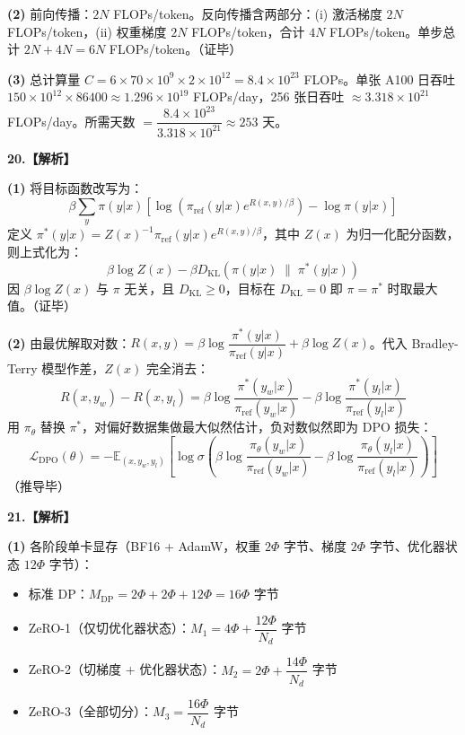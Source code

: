 \documentclass[a4paper]{ctexart}
\begin{document}
\vspace{0.4em}
\textbf{(2)} 前向传播：$2N$ FLOPs/token。反向传播含两部分：(i) 激活梯度 $2N$ FLOPs/token，(ii) 权重梯度 $2N$ FLOPs/token，合计 $4N$ FLOPs/token。单步总计 $2N+4N=6N$ FLOPs/token。\quad（证毕）

\vspace{0.4em}
\textbf{(3)} 总计算量 $C=6\times70\times10^9\times2\times10^{12}=8.4\times10^{23}$ FLOPs。单张 A100 日吞吐 $150\times10^{12}\times86400\approx1.296\times10^{19}$ FLOPs/day，256 张日吞吐 $\approx3.318\times10^{21}$ FLOPs/day。所需天数 $=\dfrac{8.4\times10^{23}}{3.318\times10^{21}}\approx\boxed{253}$ 天。

\vspace{0.8em}

\noindent\textbf{20.【解析】}

\textbf{(1)} 将目标函数改写为：
$$\beta\sum_y\pi(y|x)\!\left[\log\!\left(\pi_{\mathrm{ref}}(y|x)e^{R(x,y)/\beta}\right)-\log\pi(y|x)\right]$$
定义 $\pi^*(y|x)=Z(x)^{-1}\pi_{\mathrm{ref}}(y|x)e^{R(x,y)/\beta}$，其中 $Z(x)$ 为归一化配分函数，则上式化为：
$$\beta\log Z(x)-\beta D_{\mathrm{KL}}\!\left(\pi(y|x)\;\|\;\pi^*(y|x)\right)$$
因 $\beta\log Z(x)$ 与 $\pi$ 无关，且 $D_{\mathrm{KL}}\ge0$，目标在 $D_{\mathrm{KL}}=0$ 即 $\pi=\pi^*$ 时取最大值。\quad（证毕）

\vspace{0.4em}
\textbf{(2)} 由最优解取对数：$R(x,y)=\beta\log\dfrac{\pi^*(y|x)}{\pi_{\mathrm{ref}}(y|x)}+\beta\log Z(x)$。代入 Bradley-Terry 模型作差，$Z(x)$ 完全消去：
$$R(x,y_w)-R(x,y_l)=\beta\log\frac{\pi^*(y_w|x)}{\pi_{\mathrm{ref}}(y_w|x)}-\beta\log\frac{\pi^*(y_l|x)}{\pi_{\mathrm{ref}}(y_l|x)}$$
用 $\pi_\theta$ 替换 $\pi^*$，对偏好数据集做最大似然估计，负对数似然即为 DPO 损失：
$$\mathcal{L}_{\mathrm{DPO}}(\theta)=-\mathbb{E}_{(x,y_w,y_l)}\!\left[\log\sigma\!\left(\beta\log\frac{\pi_\theta(y_w|x)}{\pi_{\mathrm{ref}}(y_w|x)}-\beta\log\frac{\pi_\theta(y_l|x)}{\pi_{\mathrm{ref}}(y_l|x)}\right)\right]$$
（推导毕）

\vspace{0.8em}

\noindent\textbf{21.【解析】}

\textbf{(1)} 各阶段单卡显存（BF16 + AdamW，权重 $2\Phi$ 字节、梯度 $2\Phi$ 字节、优化器状态 $12\Phi$ 字节）：
\begin{itemize}[nolistsep,leftmargin=2em,itemsep=0.25em]
    \item 标准 DP：$M_{\mathrm{DP}}=2\Phi+2\Phi+12\Phi=16\Phi$ 字节
    \item ZeRO-1（仅切优化器状态）：$M_1=4\Phi+\dfrac{12\Phi}{N_d}$ 字节
    \item ZeRO-2（切梯度 + 优化器状态）：$M_2=2\Phi+\dfrac{14\Phi}{N_d}$ 字节
    \item ZeRO-3（全部切分）：$M_3=\dfrac{16\Phi}{N_d}$ 字节
\end{itemize}
\end{document}
